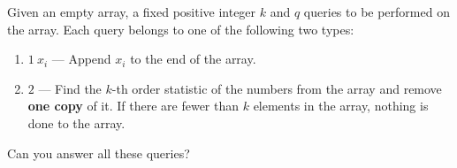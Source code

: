 Given an empty array, a fixed positive integer $k$ and $q$ queries to be performed on the array. Each query belongs to one of the following two types:
\begin{enumerate}
    \item $1\ x_i$ — Append $x_i$ to the end of the array.
    \item $2$ — Find the $k$-th order statistic of the numbers from the array and
    remove \textbf{one copy} of it. If there are fewer than $k$ elements in the array,
    nothing is done to the array.
\end{enumerate}
Can you answer all these queries?
